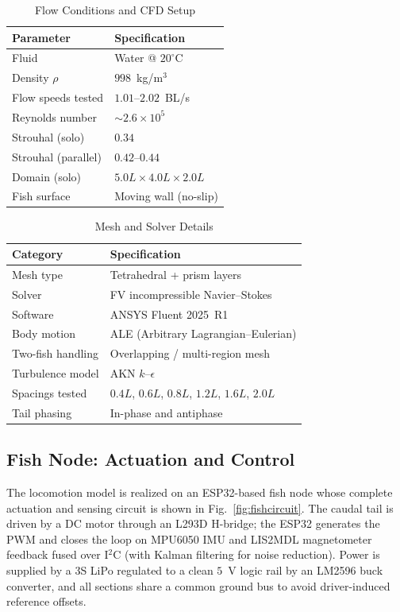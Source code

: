 \documentclass[journal]{IEEEtran}
\begin{document}
\begin{table}[!t]
\centering
\caption{Flow Conditions and CFD Setup}
\label{tab:cfd1}
\begin{tabular}{ll}
\toprule
Parameter & Specification\\
\midrule
Fluid                 & Water @ $20^\circ$C\\
Density $\rho$        & $998$~kg/m$^3$\\
Flow speeds tested    & $1.01$--$2.02$~BL/s\\
Reynolds number       & $\sim\!2.6\times10^{5}$\\
Strouhal (solo)       & $0.34$\\
Strouhal (parallel)   & $0.42$--$0.44$\\
Domain (solo)         & $5.0L\times4.0L\times2.0L$\\
Fish surface          & Moving wall (no-slip)\\
\bottomrule
\end{tabular}
\end{table}

\begin{table}[!t]
\centering
\caption{Mesh and Solver Details}
\label{tab:cfd2}
\begin{tabular}{ll}
\toprule
Category & Specification\\
\midrule
Mesh type            & Tetrahedral + prism layers\\
Solver               & FV incompressible Navier--Stokes\\
Software             & ANSYS Fluent 2025~R1\\
Body motion          & ALE (Arbitrary Lagrangian--Eulerian)\\
Two-fish handling    & Overlapping / multi-region mesh\\
Turbulence model     & AKN $k$--$\epsilon$\\
Spacings tested      & $0.4L$, $0.6L$, $0.8L$, $1.2L$, $1.6L$, $2.0L$\\
Tail phasing         & In-phase and antiphase\\
\bottomrule
\end{tabular}
\end{table}

\subsection{Fish Node: Actuation and Control}
The locomotion model is realized on an ESP32-based fish node whose complete
actuation and sensing circuit is shown in Fig.~\ref{fig:fishcircuit}. The caudal
tail is driven by a DC motor through an L293D H-bridge; the ESP32 generates the
PWM and closes the loop on MPU6050 IMU and LIS2MDL magnetometer feedback fused
over I$^2$C (with Kalman filtering for noise reduction). Power is supplied by a
3S LiPo regulated to a clean $5$~V logic rail by an LM2596 buck converter, and all
sections share a common ground bus to avoid driver-induced reference offsets.
\end{document}
